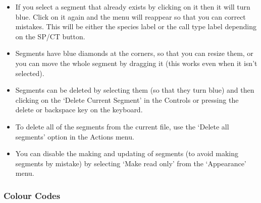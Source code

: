 \documentclass{article}
\begin{document}
\begin{itemize}
\item If you select a segment that already exists by clicking on it then it will turn blue. Click on it again and the menu will reappear so that you can correct mistakes. This will be either the species label or the call type label depending on the SP/CT button.
\item Segments have blue diamonds at the corners, so that you can resize them, or you can move the whole segment by dragging it (this works even when it isn't selected). 
\item Segments can be deleted by selecting them (so that they turn blue) and then clicking on the `Delete Current Segment' in the Controls or pressing the delete or backspace key on the keyboard. 
\item To delete all of the segments from the current file, use the `Delete all segments' option in the Actions menu. 
\item You can disable the making and updating of segments (to avoid making segments by mistake) by selecting `Make read only' from the `Appearance' menu.
\end{itemize}



\subsubsection*{Colour Codes}
\end{document}
